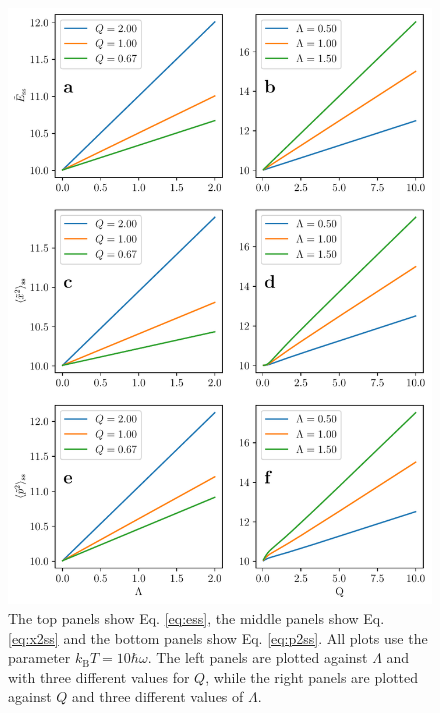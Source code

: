 \begin{figure}
    \centering
    \includegraphics[width=\textwidth]{measurement_result.pdf}
    \caption{ \small The top panels show Eq. \eqref{eq:ess}, the middle panels show Eq. \eqref{eq:x2ss} and the bottom panels show Eq. \eqref{eq:p2ss}. All plots use the parameter $k_\mathrm{B}T = 10 \hbar \omega$. The left panels are plotted against $\Lambda$ and with three different values for $Q$, while the right panels are plotted against $Q$ and three different values of $\Lambda$. }
    \label{fig:steady_state}
\end{figure}
